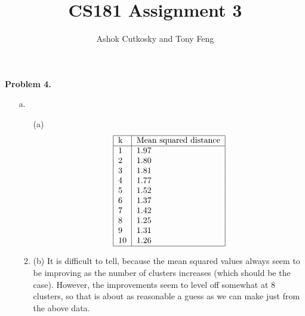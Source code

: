 \documentclass[12pt]{amsart}
\title{CS181 Assignment 3}
\author{Ashok Cutkosky and Tony Feng}
\theoremstyle{remark}
\begin{document}
\maketitle

\noindent \textbf{Problem 4.}
\begin{enumerate}
\item[a.] 
\begin{enumerate}
\item[(a)] 
\[
\begin{tabular}{|l|l|}
\hline
k & Mean squared distance \\
\hline
1 &  1.97 \\
2 & 1.80 \\
3 & 1.81 \\
4 &  1.77 \\
5 & 1.52 \\
6 & 1.37 \\
7 & 1.42 \\
8 & 1.25 \\
9 & 1.31 \\
10 & 1.26 \\
\hline
\end{tabular}
\]
\item(b) It is difficult to tell, because the mean squared values always seem to be improving as the number of clusters increases (which should be the case). However, the improvements seem to level off somewhat at 8 clusters, so that is about as reasonable a guess as we can make just from the above data. 
\end{enumerate} 
\end{enumerate}
\end{document}
